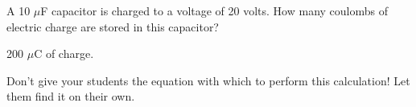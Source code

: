 

A 10 $\mu$F capacitor is charged to a voltage of 20 volts.  How many coulombs of electric charge are stored in this capacitor?







200 $\mu$C of charge.







Don't give your students the equation with which to perform this calculation!  Let them find it on their own.



